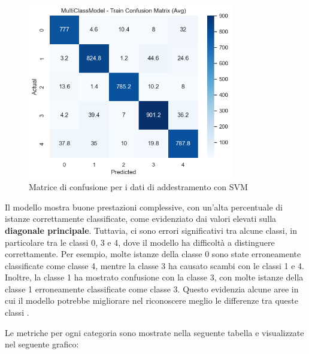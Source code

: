 \begin{figure}[H]
    \centering
    \includegraphics[width=0.8\textwidth]{images/confusion_matrix_train_svm.png}
    \caption{Matrice di confusione per i dati di addestramento con SVM}
    \label{fig:confusion_matrix_train_svm}
\end{figure}

Il modello mostra buone prestazioni complessive, con un'alta percentuale di istanze correttamente classificate, come evidenziato dai valori elevati sulla \textbf{diagonale principale}. Tuttavia, ci sono errori significativi tra alcune classi, in particolare tra le classi 0, 3 e 4, dove il modello ha difficoltà a distinguere correttamente. Per esempio, molte istanze della classe 0 sono state erroneamente classificate come classe 4, mentre la classe 3 ha causato scambi con le classi 1 e 4. Inoltre, la classe 1 ha mostrato confusione con la classe 3, con molte istanze della classe 1 erroneamente classificate come classe 3. Questo evidenzia alcune aree in cui il modello potrebbe migliorare nel riconoscere meglio le differenze tra queste classi .

\newpage

Le metriche per ogni categoria sono mostrate nella seguente tabella e visualizzate nel seguente grafico:

